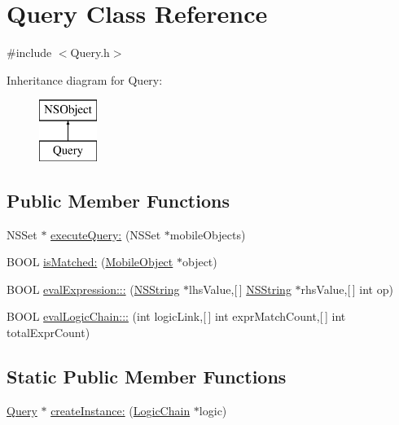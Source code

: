 \hypertarget{interface_query}{
\section{\-Query \-Class \-Reference}
\label{interface_query}
}


{\ttfamily \#include $<$\-Query.\-h$>$}

\-Inheritance diagram for \-Query\-:\begin{figure}[H]
\begin{center}
\leavevmode
\includegraphics[height=2.000000cm]{interface_query}
\end{center}
\end{figure}
\subsection*{\-Public \-Member \-Functions}
\begin{DoxyCompactItemize}
\item 
\-N\-S\-Set $\ast$ \hyperlink{interface_query_ae447cab5f85a009fb85e4ddb6e947250}{execute\-Query\-:} (\-N\-S\-Set $\ast$mobile\-Objects)
\item 
\-B\-O\-O\-L \hyperlink{interface_query_a425e041301937559713ac183ad50277f}{is\-Matched\-:} (\hyperlink{interface_mobile_object}{\-Mobile\-Object} $\ast$object)
\item 
\-B\-O\-O\-L \hyperlink{interface_query_ad602c4a9cc9d2400c4750e44095003a4}{eval\-Expression\-:::} (\hyperlink{class_n_s_string}{\-N\-S\-String} $\ast$lhs\-Value,\mbox{[}$\,$\mbox{]} \hyperlink{class_n_s_string}{\-N\-S\-String} $\ast$rhs\-Value,\mbox{[}$\,$\mbox{]} int op)
\item 
\-B\-O\-O\-L \hyperlink{interface_query_a54504edb7dfa29de7509b1f7688fd1fc}{eval\-Logic\-Chain\-:::} (int logic\-Link,\mbox{[}$\,$\mbox{]} int expr\-Match\-Count,\mbox{[}$\,$\mbox{]} int total\-Expr\-Count)
\end{DoxyCompactItemize}
\subsection*{\-Static \-Public \-Member \-Functions}
\begin{DoxyCompactItemize}
\item 
\hyperlink{interface_query}{\-Query} $\ast$ \hyperlink{interface_query_a8ea9b77831256192ac7c7a123ef3f9f8}{create\-Instance\-:} (\hyperlink{interface_logic_chain}{\-Logic\-Chain} $\ast$logic)
\end{DoxyCompactItemize}
